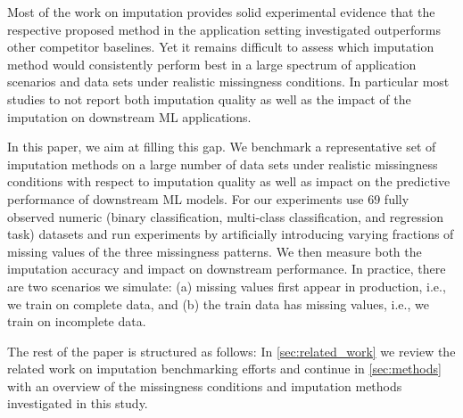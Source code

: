 Most of the work on imputation provides solid experimental evidence that the respective proposed method in the application setting investigated outperforms other competitor baselines. Yet it remains difficult to assess which imputation method would consistently perform best in a large spectrum of application scenarios and data sets under realistic missingness conditions. In particular most studies to not report both imputation quality as well as the impact of the imputation on downstream ML applications. 

In this paper, we aim at filling this gap. We benchmark a representative set of imputation methods on a large number of data sets under realistic missingness conditions with respect to imputation quality as well as impact on the predictive performance of downstream ML models. For our experiments use $69$ fully observed numeric (binary classification, multi-class classification, and regression task) datasets and run experiments by artificially introducing varying fractions of missing values of the three missingness patterns. We then measure both the imputation accuracy and impact on downstream performance. In practice, there are two scenarios we simulate: (a) missing values first appear in production, i.e., we train on complete data, and (b) the train data has missing values, i.e., we train on incomplete data.

The rest of the paper is structured as follows: In \autoref{sec:related_work} we review the related work on imputation benchmarking efforts and continue in \autoref{sec:methods} with an overview of the missingness conditions and imputation methods investigated in this study. 
